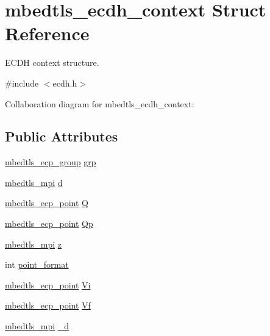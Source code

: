 \hypertarget{structmbedtls__ecdh__context}{}\section{mbedtls\+\_\+ecdh\+\_\+context Struct Reference}
\label{structmbedtls__ecdh__context}


E\+C\+DH context structure.  




{\ttfamily \#include $<$ecdh.\+h$>$}



Collaboration diagram for mbedtls\+\_\+ecdh\+\_\+context\+:
\subsection*{Public Attributes}
\begin{DoxyCompactItemize}
\item 
\mbox{\hyperlink{structmbedtls__ecp__group}{mbedtls\+\_\+ecp\+\_\+group}} \mbox{\hyperlink{structmbedtls__ecdh__context_a9fd1b03576203de87a92a2d49a4d20ed}{grp}}
\item 
\mbox{\hyperlink{structmbedtls__mpi}{mbedtls\+\_\+mpi}} \mbox{\hyperlink{structmbedtls__ecdh__context_a22e51b2ea7d4728e48e8897535831cf4}{d}}
\item 
\mbox{\hyperlink{structmbedtls__ecp__point}{mbedtls\+\_\+ecp\+\_\+point}} \mbox{\hyperlink{structmbedtls__ecdh__context_af2657e12e87be5b3e73bcf1ea2941d0b}{Q}}
\item 
\mbox{\hyperlink{structmbedtls__ecp__point}{mbedtls\+\_\+ecp\+\_\+point}} \mbox{\hyperlink{structmbedtls__ecdh__context_a64ecde7d95dcc725d6af5f8e3ce542ca}{Qp}}
\item 
\mbox{\hyperlink{structmbedtls__mpi}{mbedtls\+\_\+mpi}} \mbox{\hyperlink{structmbedtls__ecdh__context_abfd253d99f23c57cbeafc41985db764c}{z}}
\item 
int \mbox{\hyperlink{structmbedtls__ecdh__context_ae7ae7b0231e898b0d973df360aea8f17}{point\+\_\+format}}
\item 
\mbox{\hyperlink{structmbedtls__ecp__point}{mbedtls\+\_\+ecp\+\_\+point}} \mbox{\hyperlink{structmbedtls__ecdh__context_a6e374b0be49dce0fb02ca8ccfbfe1fee}{Vi}}
\item 
\mbox{\hyperlink{structmbedtls__ecp__point}{mbedtls\+\_\+ecp\+\_\+point}} \mbox{\hyperlink{structmbedtls__ecdh__context_a2ee12052791b2f212047a16b4e0dcc77}{Vf}}
\item 
\mbox{\hyperlink{structmbedtls__mpi}{mbedtls\+\_\+mpi}} \mbox{\hyperlink{structmbedtls__ecdh__context_af5412a43eb79b11a6cc13c3a9af55e13}{\+\_\+d}}
\end{DoxyCompactItemize}


